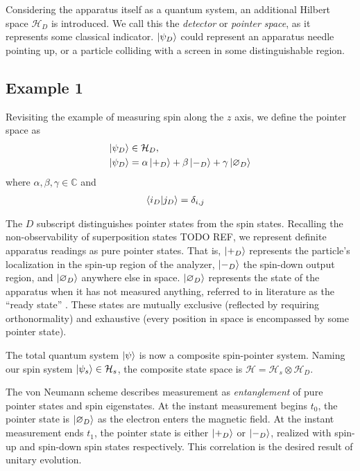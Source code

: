 Considering the apparatus itself as a quantum system, an additional Hilbert space $\mathcal{H}_D$ is introduced. We call this the \textit{detector} or \textit{pointer space}, as it represents some classical indicator. $\ket{\psi_D}$ could represent an apparatus needle pointing up, or a particle colliding with a screen in some distinguishable region.

\subsection{Example 1}
Revisiting the example of measuring spin along the $z$ axis, we define the pointer space as
\begin{align}
  \ket{\psi_D} &\in \mathcal{H}_D, \\
  \nonumber \ket{\psi_D} &= \alpha \ket{+_D} + \beta \ket{-_D} + \gamma \ket{\varnothing_D}
\end{align}
where $\alpha, \beta, \gamma \in \mathbb{C}$ and
\begin{align}
    \braket{i_D|j_D} &=\delta_{i,j}
\end{align}

The $D$ subscript distinguishes pointer states from the spin states. Recalling the non-observability of superposition states TODO REF, we represent definite apparatus readings as pure pointer states. That is, $\ket{+_D}$ represents the particle's localization in the spin-up region of the analyzer, $\ket{-_D}$ the spin-down output region, and $\ket{\varnothing_D}$ anywhere else in space. $\ket{\varnothing_D}$ represents the state of the apparatus when it has not measured anything, referred to in literature as the ``ready state'' \cite{Schlosshauer}. These states are mutually exclusive (reflected by requiring orthonormality) and exhaustive (every position in space is encompassed by some pointer state).

The total quantum system $\ket{\psi}$ is now a composite spin-pointer system. Naming our spin system $\ket{\psi_s} \in \mathcal{H}_s$, the composite state space is $\mathcal{H} = \mathcal{H}_s \otimes \mathcal{H}_D$.

The von Neumann scheme describes measurement as \textit{entanglement} of pure pointer states and spin eigenstates. At the instant measurement begins $t_0$, the pointer state is $\ket{\varnothing_D}$ as the electron enters the magnetic field. At the instant measurement ends $t_1$, the pointer state is either $\ket{+_D}$ or $\ket{-_D}$, realized with spin-up and spin-down spin states respectively. This correlation is the desired result of unitary evolution.


